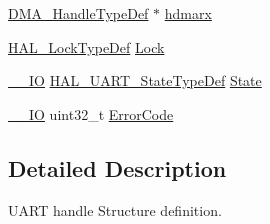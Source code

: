\begin{DoxyCompactItemize}
\hyperlink{group___d_m_a___exported___types_ga92b907d56a9c29b93d46782a7a04f91e}{D\-M\-A\-\_\-\-Handle\-Type\-Def} $\ast$ \hyperlink{struct_u_a_r_t___handle_type_def_a11b3ba9d871b8a607b5eb00bf468e3ef}{hdmarx}
\item 
\hyperlink{stm32l1xx__hal__def_8h_ab367482e943333a1299294eadaad284b}{H\-A\-L\-\_\-\-Lock\-Type\-Def} \hyperlink{struct_u_a_r_t___handle_type_def_acf20ded14a90f4f8053abb7ad61c62b0}{Lock}
\item 
\hyperlink{core__sc300_8h_aec43007d9998a0a0e01faede4133d6be}{\-\_\-\-\_\-\-I\-O} \hyperlink{group___u_a_r_t___exported___types_gaf55d844a35379c204c90be5d1e8e50ba}{H\-A\-L\-\_\-\-U\-A\-R\-T\-\_\-\-State\-Type\-Def} \hyperlink{struct_u_a_r_t___handle_type_def_a61f2d1d0228c38b6e1e32eed80dbf0c8}{State}
\item 
\hyperlink{core__sc300_8h_aec43007d9998a0a0e01faede4133d6be}{\-\_\-\-\_\-\-I\-O} uint32\-\_\-t \hyperlink{struct_u_a_r_t___handle_type_def_ab8ce937b317c505d83b31c94d5af6db8}{Error\-Code}
\end{DoxyCompactItemize}


\subsection{Detailed Description}
U\-A\-R\-T handle Structure definition. 

